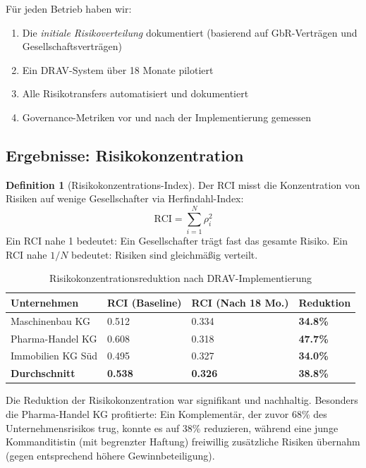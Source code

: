 \documentclass[a4paper, 12pt, twoside, openright]{report}
\theoremstyle{definition}
\newtheorem{definition}[theorem]{Definition}
\theoremstyle{definition}
\begin{document}
Für jeden Betrieb haben wir:
\begin{enumerate}
    \item Die \emph{initiale Risikoverteilung} dokumentiert (basierend auf GbR-Verträgen und Gesellschaftsverträgen)
    \item Ein DRAV-System über 18 Monate pilotiert
    \item Alle Risikotransfers automatisiert und dokumentiert
    \item Governance-Metriken vor und nach der Implementierung gemessen
\end{enumerate}

\subsection{Ergebnisse: Risikokonzentration}

\begin{definition}[Risikokonzentrations-Index]
Der RCI misst die Konzentration von Risiken auf wenige Gesellschafter via Herfindahl-Index:
\begin{equation}
\text{RCI} = \sum_{i=1}^N \rho_i^2
\end{equation}
Ein RCI nahe 1 bedeutet: Ein Gesellschafter trägt fast das gesamte Risiko. Ein RCI nahe $1/N$ bedeutet: Risiken sind gleichmäßig verteilt.
\end{definition}

\begin{table}[H]
\centering
\caption{Risikokonzentrationsreduktion nach DRAV-Implementierung}
\label{tab:rci_results}
\begin{tabular}{@{}llll@{}}
\toprule
\textbf{Unternehmen} & \textbf{RCI (Baseline)} & \textbf{RCI (Nach 18 Mo.)} & \textbf{Reduktion} \\
\midrule
Maschinenbau KG & 0.512 & 0.334 & \textbf{34.8\%} \\
Pharma-Handel KG & 0.608 & 0.318 & \textbf{47.7\%} \\
Immobilien KG Süd & 0.495 & 0.327 & \textbf{34.0\%} \\
\midrule
\textbf{Durchschnitt} & \textbf{0.538} & \textbf{0.326} & \textbf{38.8\%} \\
\bottomrule
\end{tabular}
\end{table}

Die Reduktion der Risikokonzentration war signifikant und nachhaltig. Besonders die Pharma-Handel KG profitierte: Ein Komplementär, der zuvor 68\% des Unternehmensrisikos trug, konnte es auf 38\% reduzieren, während eine junge Kommanditistin (mit begrenzter Haftung) freiwillig zusätzliche Risiken übernahm (gegen entsprechend höhere Gewinnbeteiligung).
\end{document}
